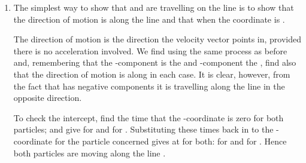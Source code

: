 \begin{problem}[A1988FMIVQ1a]
{\begin{enumerate}
The velocity of  with respect to  is simply :
\begin{eqnarray*} 
\vtr{v}_{\text{rel}} &= \vtr{v}_{C} - \vtr{v}_{A}\\ 
&= \left[(3t^{2} - 15)\vtr{i} + (-6t + 2)\vtr{j}\right] - \left[2\vtr{i} + 2\vtr{j}\right]\\ 
&= (3t^{2} - 17)\vtr{i} - (6t)\vtr{j} 
\end{eqnarray*}

At , the relative velocity is , which has a magnitude of  $=$  $=$ . The angle the velocity makes to  can be measured clockwise or anticlockwise, depending on convention. The vector makes an angle of  to the negative -axis, which is $157.4^{\circ}$ clockwise or equivalently $202.6^{\circ}$ anticlockwise.
	\item The simplest way to show that  and  are travelling on the line  is to show that the direction of motion is along the line  and that when  the  coordinate is .

The direction of motion is the direction the velocity vector points in, provided there is no acceleration involved. We find  using the same process as before and, remembering that the -component is the  and -component the , find also that the direction of motion is along  in each case. It is clear, however, from the fact that  has negative components it is travelling along the line in the opposite direction.

To check the intercept, find the time that the -coordinate is zero for both particles;  and  give  for  and  for . Substituting these times back in to the -coordinate for the particle concerned gives  at  for both:  for  and  for . Hence both particles are moving along the line .


\end{enumerate}}
\end{problem}
